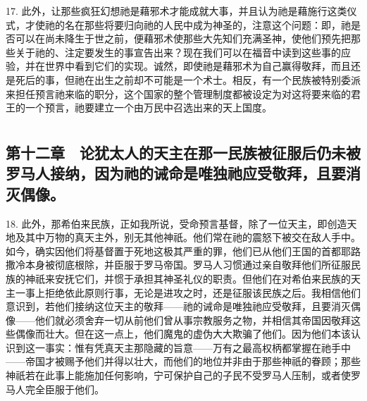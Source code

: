 17. 此外，让那些疯狂幻想祂是藉邪术才能成就大事，并且认为祂是藉施行这类仪式，才使祂的名在那些将要归向祂的人民中成为神圣的，注意这个问题：即，祂是否可以在尚未降生于世之前，便藉邪术使那些大先知们充满圣神，使他们预先把那些关于祂的、注定要发生的事宣告出来？现在我们可以在福音中读到这些事的应验，并在世界中看到它们的实现。诚然，即使祂是藉邪术为自己赢得敬拜，而且还是死后的事，但祂在出生之前却不可能是一个术士。相反，有一个民族被特别委派来担任预言祂来临的职分，这个国家的整个管理制度都被设定为对这将要来临的君王的一个预言，祂要建立一个由万民中召选出来的天上国度。\par



\section{}


\subsection{第十二章　论犹太人的天主在那一民族被征服后仍未被罗马人接纳，因为祂的诫命是唯独祂应受敬拜，且要消灭偶像。}

18. 此外，那希伯来民族，正如我所说，受命预言基督，除了一位天主，即创造天地及其中万物的真天主外，别无其他神祇。他们常在祂的震怒下被交在敌人手中。如今，确实因他们将基督置于死地这极其严重的罪，他们已从他们王国的首都耶路撒冷本身被彻底根除，并臣服于罗马帝国。罗马人习惯通过亲自敬拜他们所征服民族的神祇来安抚它们，并惯于承担其神圣礼仪的职责。但他们在对希伯来民族的天主一事上拒绝依此原则行事，无论是进攻之时，还是征服该民族之后。我相信他们意识到，若他们接纳这位天主的敬拜——祂的诫命是唯独祂应受敬拜，且要消灭偶像——他们就必须舍弃一切从前他们曾从事宗教服务之物，并相信其帝国因敬拜这些偶像而壮大。但在这一点上，他们魔鬼的虚伪大大欺骗了他们。因为他们本该认识到这一事实：惟有凭真天主那隐藏的旨意——万有之最高权柄都掌握在祂手中——帝国才被赐予他们并得以壮大，而他们的地位并非由于那些神祇的眷顾；那些神祇若在此事上能施加任何影响，宁可保护自己的子民不受罗马人压制，或者使罗马人完全臣服于他们。\par

